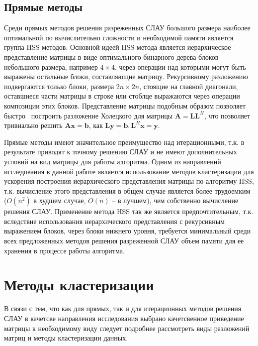 \subsection{Прямые методы}
Среди прямых методов решения разреженных СЛАУ большого размера наиболее оптимальной по вычислительно сложности и необходимой памяти является группа HSS методов. Основной идеей HSS метода является иерархическое представление матрицы в виде оптимального бинарного дерева блоков небольшого размера, например $4 \times 4$, через операции над которыми могут быть выражены остальные блоки, составляющие матрицу. Рекурсивному разложению подвергаются только блоки, размера $2n \times 2n$, стоящие на главной диагонали, оставшиеся части матрицы в строке или стоблце выражаются через операции композиции этих блоков. Представление матрицы подобным образом позволяет быстро~\cite{baseHSS} построить разложение Холецкого для матрицы $\mathbf{A} = \mathbf{L}\mathbf{L}^H$, что позволяет тривиально решить $\mathbf{A}\mathbf{x} = \mathbf{b}$, как $\mathbf{L}\mathbf{y} = \mathbf{b}, \mathbf{L}^H\mathbf{x} = \mathbf{y}$.


Прямые методы имеют значительное преимущество над итерационными, т.к. в результате приводят к точному решению СЛАУ и не имеют дополнительных условий на вид матрицы для работы алгоритма. Одним из направлений исследования в данной работе является использование методов кластеризации для ускорения построения иерархического представления матрицы по алгоритму HSS, т.к. вычисление этого представления в общем случае является более трудоемким ($O(n^2)$ в худшем случае, $O(n)$ -- в лучшем), чем собственно вычисление решения СЛАУ. Применение метода HSS так же является предпочтительным, т.к. вследствие использования иерархического представления с рекурсивным выражением блоков, через блоки нижнего уровня, требуется минимальный среди всех предложенных методов решения разреженной СЛАУ объем памяти для ее хранения в процессе работы алгоритма.


\section{Методы кластеризации}
В связи с тем, что как для прямых, так и для итерационных методов решения СЛАУ в качетсве направления исследования выбрано качетсвенное приведение матрицы к необходимому виду следует подробнее рассмотреть виды разложений матриц и методы кластеризации данных.

